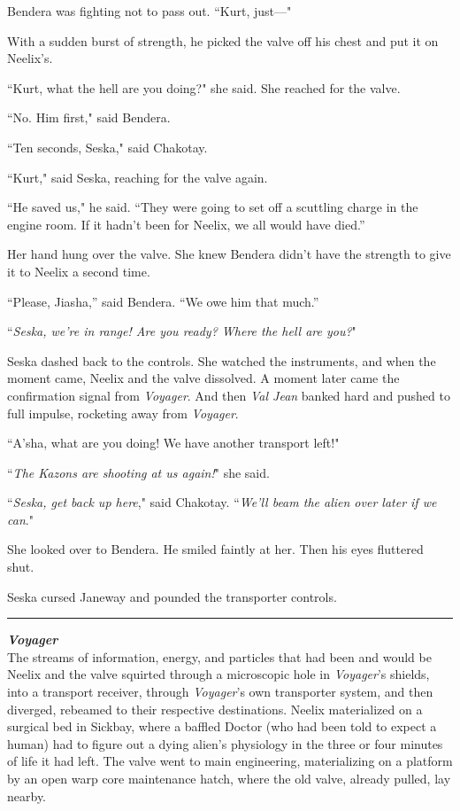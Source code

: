 \documentclass[twoside,letterpaper,12pt]{memoir}
\begin{document}
Bendera was fighting not to pass out. ``Kurt, just---"

With a sudden burst of strength, he picked the valve off his chest and put it on Neelix's.

``Kurt, what the hell are you doing?" she said. She reached for the valve.

``No. Him first," said Bendera.

``Ten seconds, Seska," said Chakotay.

``Kurt," said Seska, reaching for the valve again.

``He saved us," he said. ``They were going to set off a scuttling charge in the engine room. If it hadn't been for Neelix, we all would have died.”

Her hand hung over the valve. She knew Bendera didn’t have the strength to give it to Neelix a second time.

``Please, Jiasha,” said Bendera. ``We owe him that much.”

``\textit{Seska, we're in range! Are you ready? Where the hell are you?}"

Seska dashed back to the controls. She watched the instruments, and when the moment came, Neelix and the valve dissolved. A moment later came the confirmation signal from \textit{Voyager}. And then \textit{Val Jean} banked hard and pushed to full impulse, rocketing away from \textit{Voyager}.

``A'sha, what are you doing! We have another transport left!"

``\textit{The Kazons are shooting at us again!}" she said.

``\textit{Seska, get back up here}," said Chakotay. ``\textit{We'll beam the alien over later if we can}."

She looked over to Bendera. He smiled faintly at her. Then his eyes fluttered shut.

Seska cursed Janeway and pounded the transporter controls.

\fancybreak{\rule{3cm}{0.4 pt}}
\noindent\textit{\textbf{Voyager}}\\

The streams of information, energy, and particles that had been and would be Neelix and the valve squirted through a microscopic hole in \textit{Voyager}'s shields, into a transport receiver, through \textit{Voyager}'s own transporter system, and then diverged, rebeamed to their respective destinations. Neelix materialized on a surgical bed in Sickbay, where a baffled Doctor (who had been told to expect a human) had to figure out a dying alien's physiology in the three or four minutes of life it had left. The valve went to main engineering, materializing on a platform by an open warp core maintenance hatch, where the old valve, already pulled, lay nearby.
\end{document}
